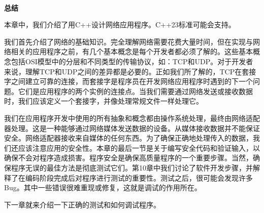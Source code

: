 \noindent\textbf{}\ \par
\textbf{总结} \  \par
本章中，我们介绍了用C++设计网络应用程序。C++23标准可能会支持。 \par                                                                                                                                                                                                                                                                                                                                                                                                                                                                                                                                                                                                                                                                                                                                                                                                                                                                                                                                                                                                                                                                                                                                                                                                                                                                                                                                    
我们首先介绍了网络的基础知识。完全理解网络需要花费大量时间，但在实现与网络相关的应用程序之前，有几个基本概念是每个开发者都必须了解的。这些基本概念包括OSI模型中的分层和不同类型的传输协议，如：TCP和UDP。对于开发者来说，理解TCP和UDP之间的差异都是必要的。正如我们所了解的，TCP在套接字之间建立可靠的连接，而套接字是程序员在开发网络应用程序时遇到的下一个问题。它们是应用程序的两个实例的连接点。当我们需要通过网络发送或接收数据时，我们应该定义一个套接字，并像处理常规文件一样处理它。 \par
我们在应用程序开发中使用的所有抽象和概念都由操作系统处理，最终由网络适配器处理。这是一种能够通过网络媒体发送数据的设备。从媒体接收数据并不能保证安全。网络适配器接收来自媒体的任何东西。为了确保正确地处理传入的数据，我们还应该注意应用的安全性。本章的最后一节是关于编写安全代码和验证输入，以确保不会对程序造成损害。程序安全是确保高质量程序的一个重要步骤。当然，确保程序无误的最佳方法是彻底测试它们。第10章中我们讨论了软件开发步骤，并解释了在编码阶段完成后对程序进行测试的重要性。测试之后，很可能会发现许多Bug。其中一些错误很难重现或修复，这就是调试的作用所在。 \par
下一章就来介绍一下正确的测试和如何调试程序。 \par

